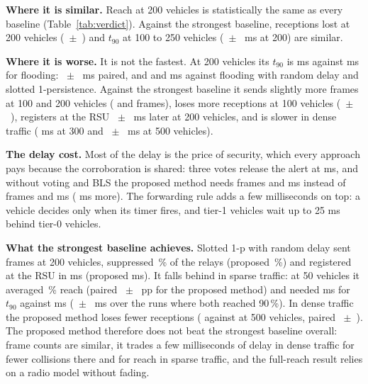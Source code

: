 \documentclass[11pt, a4paper]{article}
\begin{document}
\noindent\textbf{Where it is similar.} Reach at 200 vehicles is statistically the same as every baseline
(Table~\ref{tab:verdict}). Against the strongest baseline, receptions lost at 200 vehicles
(\NDLossSlotRad{}~$\pm$~\NDLossSlotRadCI) and $t_{90}$ at 100 to 250 vehicles (\NDTnSlotRad{}~$\pm$~\NDTnSlotRadCI{} ms at 200) are similar.

\noindent\textbf{Where it is worse.} It is not the fastest. At 200 vehicles its $t_{90}$ is \NTnProp{} ms against
\NTnFlood{} ms for flooding: \NDTnFlood{}~$\pm$~\NDTnFloodCI{} ms paired, and \NDTnFloodRad{} and \NDTnSlot{} ms
against flooding with random delay and slotted 1-persistence. Against the strongest baseline it sends slightly more
frames at 100 and 200 vehicles (\NDFrSlotRadHundred{} and \NDFrSlotRad{} frames), loses more receptions at 100 vehicles
(\NDLossSlotRadHundred{}~$\pm$~\NDLossSlotRadHundredCI), registers at the RSU \NDRsuSlotRad{}~$\pm$~\NDRsuSlotRadCI{} ms
later at 200 vehicles, and is slower in dense traffic (\NDTnSlotRadThreeH{} ms at 300 and
\NDTnSlotRadFiveH{}~$\pm$~\NDTnSlotRadFiveHCI{} ms at 500 vehicles).

\noindent\textbf{The delay cost.} Most of the delay is the price of security, which every approach pays because the
corroboration is shared: three votes release the alert at \NQuorumMs{} ms, and without voting and BLS the proposed
method needs \NFrNoSec{} frames and \NTnNoSec{} ms instead of \NFrProp{} frames and \NTnProp{} ms (\NSecTn{} ms
more). The forwarding rule adds a few milliseconds on top: a vehicle decides only when its timer fires, and tier-1
vehicles wait up to 25 ms behind tier-0 vehicles.

\noindent\textbf{What the strongest baseline achieves.} Slotted 1-p with random delay sent \NFrSlotRad{} frames at 200
vehicles, suppressed \NSupSlotRad\,\% of the relays (proposed \NSupProp\,\%) and registered at the RSU in \NRsuSlotRad{}
ms (proposed \NRsuProp{} ms). It falls behind in sparse traffic: at 50 vehicles it averaged \NReachSlotRadFifty\,\%
reach (paired \NDReachSlotRadFifty{}~$\pm$~\NDReachSlotRadFiftyCI{} pp for the proposed method) and needed
\NTnSlotRadFifty{} ms for $t_{90}$ against \NTnPropFifty{} ms (\NDTnSlotRadFifty{}~$\pm$~\NDTnSlotRadFiftyCI{} ms over the
\NNTnSlotRadFifty{} runs where both reached 90\,\%). In dense traffic the proposed method loses fewer receptions
(\NLossPropFiveH{} against \NLossSlotRadFiveH{} at 500 vehicles, paired
\NDLossSlotRadFiveH{}~$\pm$~\NDLossSlotRadFiveHCI). The proposed method therefore does not beat the strongest baseline overall: frame counts are
similar, it trades a few milliseconds of delay in dense traffic for fewer collisions there and for reach in sparse
traffic, and the full-reach result relies on a radio model without fading.
\end{document}
